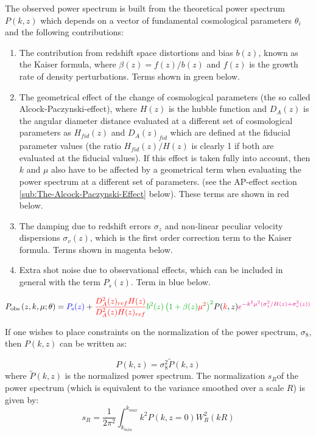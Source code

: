 The observed power spectrum is built from the theoretical power spectrum
$P(k,z)$ which depends on a vector of fundamental cosmological parameters
$\theta_{i}$ and the following contributions:
\begin{enumerate}
\item The contribution from redshift space distortions and bias $b(z)$,
known as the Kaiser formula, where $\beta(z)=f(z)/b(z)$ and $f(z)$
is the growth rate of density perturbations. Terms shown in green
below. 
\item The geometrical effect of the change of cosmological parameters (the
so called Alcock-Paczynski-effect), where $H(z)$ is the hubble function
and $D_{A}(z)$ is the angular diameter distance evaluated at a different
set of cosmological parameters as $H_{fid}(z)$ and $D_{A}(z)_{fid}$
which are defined at the fiducial parameter values (the ratio $H_{fid}(z)/H(z)$
is clearly 1 if both are evaluated at the fiducial values). If this
effect is taken fully into account, then $k$ and $\mu$ also have
to be affected by a geometrical term when evaluating the power spectrum
at a different set of parameters. (see the AP-effect section \ref{sub:The-Alcock-Paczynski-Effect}
below). These terms are shown in red below.
\item The damping due to redshift errors $\sigma_{z}$ and non-linear peculiar
velocity dispersions $\sigma_{v}(z)$, which is the first order correction
term to the Kaiser formula. Terms shown in magenta below. 
\item Extra shot noise due to observational effects, which can be included
in general with the term $P_{s}(z)$. Term in blue below.
\end{enumerate}
\begin{equation}
P_{{\rm obs}}\left(z,k,\mu;\theta\right)=\textcolor{blue}{P_{{\rm s}}(z)}+\textcolor{red}{\frac{D_{A}^{2}(z)_{ref}H(z)}{D_{A}^{2}(z)H(z)_{ref}}}{\color{green}b^{2}(z)\left(1+\beta(z){\color{red}\mu}^{{\color{red}2}}\right)^{2}}P({\color{red}k},z){\color{magenta}e^{-k^{2}\mu^{2}(\sigma_{z}^{2}/H(z)+\sigma_{v}^{2}(z))}}\label{eq:obs-power-basic}
\end{equation}


If one wishes to place constraints on the normalization of the power
spectrum, $\sigma_{8}$, then $P(k,z)$ can be written as:

\begin{equation}
P(k,z)=\sigma_{8}^{2}\tilde{P}(k,z)\label{eq:normalizedPk}
\end{equation}
where $\tilde{P}(k,z)$ is the normalized power spectrum. The normalization
$s_{R}$of the power spectrum (which is equivalent to the variance
smoothed over a scale $R$) is given by:
\begin{equation}
s_{R}=\frac{1}{2\pi^{2}}\int_{k_{min}}^{k_{max}}k^{2}P(k,z=0)W_{R}^{2}(kR)\label{eq:normalizationPk}
\end{equation}


